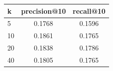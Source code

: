 \begin{tabular}{lcc}
\toprule
k & precision@10 & recall@10 \\
\midrule
5 & 0.1768 & 0.1596 \\
10 & 0.1861 & 0.1765 \\
20 & 0.1838 & 0.1786 \\
40 & 0.1805 & 0.1765 \\
\bottomrule
\end{tabular}
